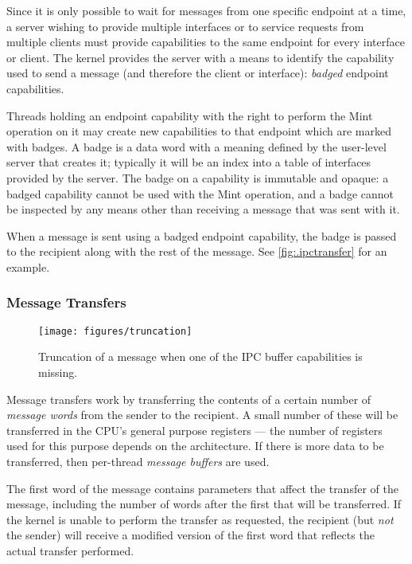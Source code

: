 Since it is only possible to wait for messages from one specific endpoint at a
time, a server wishing to provide multiple interfaces or to service requests
from multiple clients must provide capabilities to the same endpoint for every
interface or client. The kernel provides the server with a means to identify
the capability used to send a message (and therefore the client or interface):
\emph{badged} endpoint capabilities.

Threads holding an endpoint capability with the right to perform the
Mint operation on it may create new capabilities to that endpoint which
are marked with badges. A badge is a data word with a meaning defined by
the user-level server that creates it; typically it will be an index into a
table of interfaces provided by the server. The badge on a capability is
immutable and opaque: a badged capability cannot be used with the Mint operation, and a badge cannot be inspected by any means other than receiving a message that was sent with it.

When a message is sent using a badged endpoint capability, the badge is passed
to the recipient along with the rest of the message. See
\autoref{fig:.ipctransfer} for an example.

\subsubsection{Message Transfers}

\begin{figure}
\centering \texttt{[image: figures/truncation]}
\caption[truncation]{Truncation of a message when one of the IPC buffer capabilities is
missing.}
\end{figure}

Message transfers work by transferring the contents of a certain number of
\emph{message words} from the sender to the recipient. A small number of
these will be transferred in the CPU's general purpose registers --- the number
of registers used for this purpose depends on the architecture. If there is
more data to be transferred, then per-thread \emph{message buffers} are used.

The first word of the message contains parameters that affect the transfer of
the message, including the number of words after the first that will be
transferred. If the kernel is unable to perform the transfer as requested, the
recipient (but \emph{not} the sender) will receive a modified version of the
first word that reflects the actual transfer performed.

